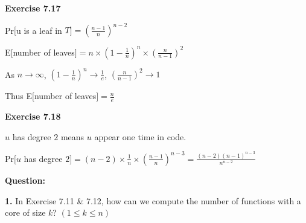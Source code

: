 \documentclass{article} %
\begin{document}
	\textbf{Exercise 7.17}\par
	Pr$[$u is a leaf in $T]=(\frac{n-1}{n})^{n-2}$\par
	E$[$number of leaves$]=n\times(1-\frac{1}{n})^{n}\times (\frac{n}{n-1})^2$\par
	As $n\rightarrow\infty$, $(1-\frac{1}{n})^{n}\rightarrow\frac{1}{e}$,  $(\frac{n}{n-1})^2\rightarrow1$\par
	Thus E$[$number of leaves$]=\frac{n}{e}$\par
	\textbf{Exercise 7.18}\par
	$u$ has degree $2$ means $u$ appear one time in code.\par
	Pr$[u$ has degree $2]=(n-2)\times\frac{1}{n}\times(\frac{n-1}{n})^{n-3}=\frac{(n-2)(n-1)^{n-3}}{n^{n-2}}$\par
	\textbf{Question:}\par
	\textbf{1.}  In Exercise 7.11 \& 7.12, how can we compute the number of functions with a core of size $k$? $(1\leq k\leq n)$
\end{document}

